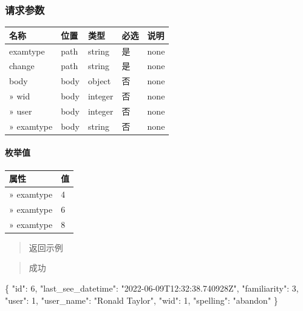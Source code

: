 \documentclass[
]{article}
\newenvironment{Shaded}{}{}
\newcommand{\DataTypeTok}[1]{\textcolor[rgb]{0.56,0.13,0.00}{#1}}
\newcommand{\DecValTok}[1]{\textcolor[rgb]{0.25,0.63,0.44}{#1}}
\newcommand{\FunctionTok}[1]{\textcolor[rgb]{0.02,0.16,0.49}{#1}}
\newcommand{\StringTok}[1]{\textcolor[rgb]{0.25,0.44,0.63}{#1}}
\begin{document}
\hypertarget{ux8bf7ux6c42ux53c2ux6570-14}{%
\subsubsection{请求参数}\label{ux8bf7ux6c42ux53c2ux6570-14}}

\begin{longtable}[]{@{}lllll@{}}
\toprule
名称 & 位置 & 类型 & 必选 & 说明 \\
\midrule
\endhead
examtype & path & string & 是 & none \\
change & path & string & 是 & none \\
body & body & object & 否 & none \\
» wid & body & integer & 否 & none \\
» user & body & integer & 否 & none \\
» examtype & body & string & 否 & none \\
\bottomrule
\end{longtable}

\hypertarget{ux679aux4e3eux503c-3}{%
\paragraph{枚举值}\label{ux679aux4e3eux503c-3}}

\begin{longtable}[]{@{}ll@{}}
\toprule
属性 & 值 \\
\midrule
\endhead
» examtype & 4 \\
» examtype & 6 \\
» examtype & 8 \\
\bottomrule
\end{longtable}

\begin{quote}
返回示例
\end{quote}

\begin{quote}
成功
\end{quote}

\begin{Shaded}
\begin{Highlighting}[]
\FunctionTok{\{}
  \DataTypeTok{"id"}\FunctionTok{:} \DecValTok{6}\FunctionTok{,}
  \DataTypeTok{"last\_see\_datetime"}\FunctionTok{:} \StringTok{"2022{-}06{-}09T12:32:38.740928Z"}\FunctionTok{,}
  \DataTypeTok{"familiarity"}\FunctionTok{:} \DecValTok{3}\FunctionTok{,}
  \DataTypeTok{"user"}\FunctionTok{:} \DecValTok{1}\FunctionTok{,}
  \DataTypeTok{"user\_name"}\FunctionTok{:} \StringTok{"Ronald Taylor"}\FunctionTok{,}
  \DataTypeTok{"wid"}\FunctionTok{:} \DecValTok{1}\FunctionTok{,}
  \DataTypeTok{"spelling"}\FunctionTok{:} \StringTok{"abandon"}
\FunctionTok{\}}
\end{Highlighting}
\end{Shaded}
\end{document}
